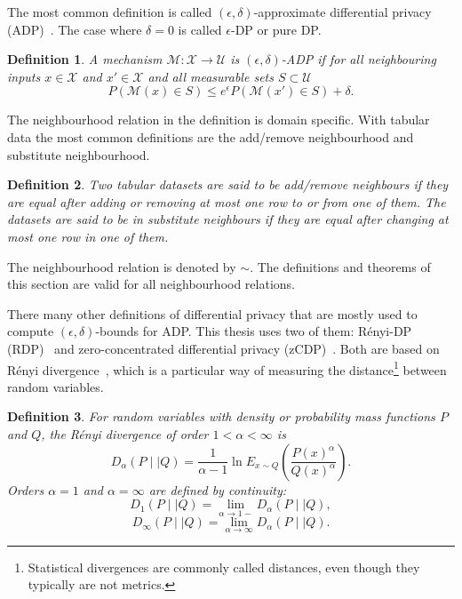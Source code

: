 \documentclass[english,twoside,openright]{HYgraduMLDS}
\newtheorem{definition}{Definition}
\newcommand{\dmid}{\mid\mid}
\newcommand{\calm}{{\mathcal{M}}}
\newcommand{\calx}{{\mathcal{X}}}
\newcommand{\calu}{{\mathcal{U}}}
\begin{document}
The most common definition is called \((\epsilon, \delta)\)-approximate
differential privacy (ADP)~\cite{DKM06, DwR14}.
The case where \(\delta = 0\) is called \(\epsilon\)-DP or 
pure DP.

\begin{definition}\label{ADP-definition}
    A mechanism \(\calm\colon \calx \to \calu\) is \((\epsilon, \delta)\)-ADP if
    for all neighbouring inputs \(x\in \calx\) and \(x'\in \calx\) and 
    all measurable sets \(S \subset \calu\)
    \[
        P(\calm(x)\in S) \leq e^\epsilon P(\calm(x')\in S) + \delta.
    \]
\end{definition}

The neighbourhood relation in the definition is domain specific. With tabular 
data the most common definitions are the add/remove neighbourhood and 
substitute neighbourhood.
\begin{definition}
    Two tabular datasets are said to be add/remove neighbours if they are equal 
    after adding or removing at most one row to or from one of them. The datasets 
    are said to be in substitute neighbours if they are equal after 
    changing at most one row in one of them.
\end{definition}
The neighbourhood relation is denoted by \(\sim\). The definitions and 
theorems of this section are valid for all neighbourhood relations.

There many other definitions of differential privacy that are mostly used
to compute \((\epsilon, \delta)\)-bounds for ADP. This thesis uses two of them: 
Rényi-DP (RDP)~\cite{Mironov17} and 
zero-concentrated differential privacy (zCDP)~\cite{BuS16}. Both are based 
on Rényi divergence~\cite{Mironov17}, which is a particular way of 
measuring the distance\footnote{
  Statistical divergences are commonly called distances, even though they
  typically are not metrics.
} between random variables.

\begin{definition}
    For random variables with density or probability mass functions 
    \(P\) and \(Q\), the Rényi divergence of order
    \(1 < \alpha < \infty\) is
    \[
        D_\alpha(P\dmid Q) = \frac{1}{\alpha - 1}\ln E_{x\sim Q}
        \left(\frac{P(x)^\alpha}{Q(x)^\alpha}\right).
    \]
    Orders \(\alpha = 1\) and \(\alpha = \infty\) are defined 
    by continuity:
    \[
        D_1(P\dmid Q) = \lim_{\alpha \to 1-} D_\alpha(P\dmid Q),
    \]
    \[
        D_\infty(P \dmid Q) = \lim_{\alpha\to \infty}D_\alpha(P\dmid Q).
    \]
\end{definition}
\end{document}
